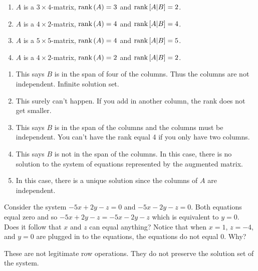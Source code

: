 \begin{enumialphparenastyle}
\begin{ex}
\begin{enumerate}
  \item $A$ is a $3\times 4$-matrix, $\mbox{\rm rank}\left(A\right) =3$ and 
    $\mbox{\rm rank}\left[A|B\right] =2$.
    
  \item $A$ is a $4\times 2$-matrix, $\mbox{\rm rank}\left(A\right) =4$ and 
    $\mbox{\rm rank}\left[A|B \right] =4$. 
    
  \item $A$ is a $5\times 5$-matrix, $\mbox{\rm rank}\left(A\right) =4$ and 
    $\mbox{\rm rank}\left[A|B \right] =5$. 
    
  \item $A$ is a $4\times 2$-matrix, $\mbox{\rm rank}\left(A\right) =2$ and 
    $\mbox{\rm rank}\left[A|B \right] =2$.
  \end{enumerate}
  
  \begin{sol}
    \begin{enumerate}
    \item This says $B$ is in the span of four of the columns. Thus the columns are not independent. Infinite solution set.
    \item This surely can't happen. If you add in another column, the rank does not get smaller.
    \item This says $B$ is in the span of the columns and the columns must be
      independent. You can't have the rank equal 4 if you only have two columns.
    \item This says $B$ is not in the span of the columns. In this case, there is no solution to the system of equations represented by the augmented matrix.
    \item In this case, there is a
      unique solution since the columns of $A$ are independent.
    \end{enumerate}
  \end{sol}
\end{ex}

\begin{ex} Consider the system $-5x+2y-z=0$ and $-5x-2y-z=0$. Both equations
equal zero and so $-5x+2y-z=-5x-2y-z$ which is equivalent to $y=0$. Does it follow that $x$
and $z$ can equal anything?  Notice that when $x=1$, $z=-4$, and $y=0$ are plugged in
to the equations, the equations do not equal $0$. Why?
\begin{sol}
These are not legitimate row
operations. They do not preserve the solution set of the system.
\end{sol}
\end{ex}

\end{enumialphparenastyle}
